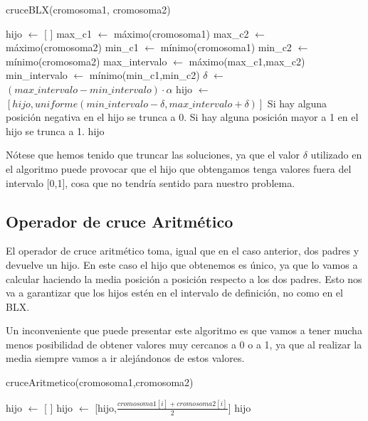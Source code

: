 \documentclass[12pt,a4paper]{article}
\begin{document}
	\begin{algorithm}
		\caption{cruceBLX(cromosoma1, cromosoma2)}
		\begin{algorithmic}
			\STATE hijo $\leftarrow$ [ ]
			\STATE max\_c1 $\leftarrow$ máximo(cromosoma1)
			\STATE max\_c2 $\leftarrow$ máximo(cromosoma2)
			\STATE min\_c1 $\leftarrow$ mínimo(cromosoma1)
			\STATE min\_c2 $\leftarrow$ mínimo(cromosoma2)
			\STATE max\_intervalo $\leftarrow$ máximo(max\_c1,max\_c2)
			\STATE min\_intervalo $\leftarrow$ mínimo(min\_c1,min\_c2)
			\STATE $\delta$ $\leftarrow$ $(max\_intervalo-min\_intervalo)\cdot \alpha$
				\STATE hijo $\leftarrow$ $[hijo,uniforme(min\_intervalo - \delta, max\_intervalo + \delta)]$
			\ENDFOR
			\STATE Si hay alguna posición negativa en el hijo se trunca a 0.
			\STATE Si hay alguna posición mayor a 1 en el hijo se trunca a 1.
			\RETURN hijo
		\end{algorithmic}
	\end{algorithm}

	Nótese que hemos tenido que truncar las soluciones, ya que el valor $\delta$ utilizado en el algoritmo puede provocar que el hijo que obtengamos tenga valores fuera del intervalo [0,1], cosa que no tendría sentido para nuestro problema.

	\subsection{Operador de cruce Aritmético}

	El operador de cruce aritmético toma, igual que en el caso anterior, dos padres y devuelve un hijo. En este caso el hijo que obtenemos es único, ya que lo vamos a calcular haciendo la media posición a posición respecto a los dos padres. Esto nos va a garantizar que los hijos estén en el intervalo de definición, no como en el BLX.

	Un inconveniente que puede presentar este algoritmo es que vamos a tener mucha menos posibilidad de obtener valores muy cercanos a 0 o a 1, ya que al realizar la media siempre vamos a ir alejándonos de estos valores.

	\begin{algorithm}
		\caption{cruceAritmetico(cromosoma1,cromosoma2)}
		\begin{algorithmic}
			\STATE hijo $\leftarrow$ [ ]
			\FOR{i=0 , ... , longitud(cromosoma1)}
				\STATE hijo $\leftarrow$ [hijo,$\frac{cromosoma1[i]+cromosoma2[i]}{2}$]
			\ENDFOR
			\RETURN hijo
		\end{algorithmic}
	\end{algorithm}
\end{document}

